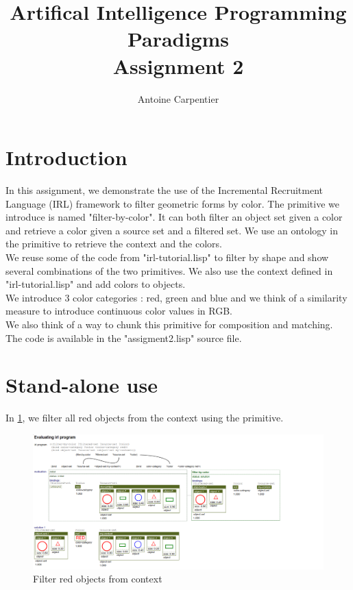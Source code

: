 \documentclass[a4paper,10pt]{article}
\title{Artifical Intelligence Programming Paradigms\\Assignment 2}
\author{Antoine Carpentier}
\begin{document}
\maketitle

\section{Introduction}

In this assignment, we demonstrate the use of the Incremental Recruitment Language (IRL) framework to filter geometric forms by color. The primitive we introduce is named "filter-by-color". It can both filter an object set given a color and retrieve a color given a source set and a filtered set. We use an ontology in the primitive to retrieve the context and the colors. \\
We reuse some of the code from "irl-tutorial.lisp" to filter by shape and show several combinations of the two primitives. 
We also use the context defined in "irl-tutorial.lisp" and add colors to objects. \\
We introduce 3 color categories : red, green and blue and we think of a similarity measure to introduce continuous color values in RGB. \\
We also think of a way to chunk this primitive for composition and matching. \\
The code is available in the "assigment2.lisp" source file.

\section{Stand-alone use}

In \ref{fig:filter-color-1-evaluation}, we filter all red objects from the context using the primitive.

\begin{figure}[!h]
    \centering
    \includegraphics[width=1.0\textwidth]{filter-color-1-evaluation.png}
    \caption{Filter red objects from context}
    \label{fig:filter-color-1-evaluation}
\end{figure}
\end{document}
